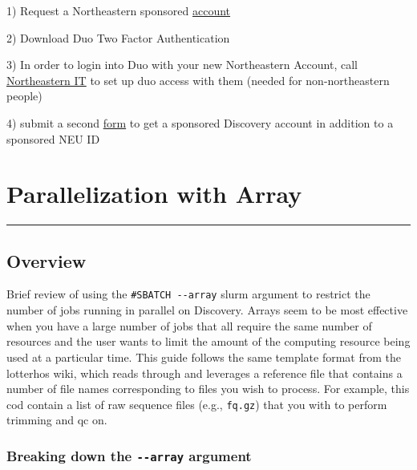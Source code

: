 \documentclass[
  letterpaper,
  DIV=11,
  numbers=noendperiod]{scrreprt}
\begin{document}
1) Request a Northeastern sponsored
\href{https://research.northeastern.edu/nu-res/request-nu-sponsored-account/}{account}

2) Download Duo Two Factor Authentication

3) In order to login into Duo with your new Northeastern Account, call
\href{https://its.northeastern.edu/support/}{Northeastern IT} to set up
duo access with them (needed for non-northeastern people)

4) submit a second
\href{https://rc-docs.northeastern.edu/en/latest/get_started/get_access.html}{form}
to get a sponsored Discovery account in addition to a sponsored NEU ID

\hypertarget{parallelization-with-array}{%
\chapter{Parallelization with Array}\label{parallelization-with-array}}

\begin{center}\rule{0.5\linewidth}{0.5pt}\end{center}

\hypertarget{overview-3}{%
\section*{\texorpdfstring{\textbf{Overview}}{Overview}}\label{overview-3}}


Brief review of using the \texttt{\#SBATCH\ -\/-array} slurm argument to
restrict the number of jobs running in parallel on Discovery. Arrays
seem to be most effective when you have a large number of jobs that all
require the same number of resources and the user wants to limit the
amount of the computing resource being used at a particular time. This
guide follows the same template format from the lotterhos wiki, which
reads through and leverages a reference file that contains a number of
file names corresponding to files you wish to process. For example, this
cod contain a list of raw sequence files (e.g., \texttt{fq.gz}) that you
with to perform trimming and qc on.

\hypertarget{breaking-down-the---array-argument}{%
\subsection*{\texorpdfstring{\textbf{Breaking down the
\texttt{-\/-array}
argument}}{Breaking down the -\/-array argument}}\label{breaking-down-the---array-argument}}
\end{document}
